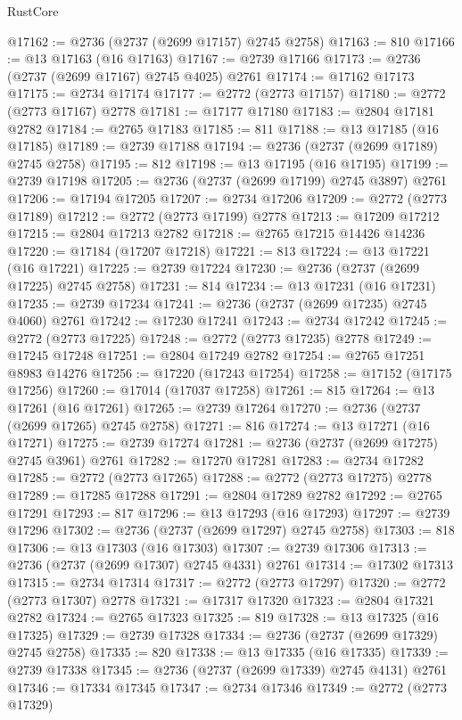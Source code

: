 \begin{lexlean}{RustCore}
\begin{coremodule}
@17162 := @2736 (@2737 (@2699 @17157) @2745 @2758)
@17163 := 810
@17166 := @13 @17163 (@16 @17163)
@17167 := @2739 @17166
@17173 := @2736 (@2737 (@2699 @17167) @2745 @4025) @2761
@17174 := @17162 @17173
@17175 := @2734 @17174
@17177 := @2772 (@2773 @17157)
@17180 := @2772 (@2773 @17167) @2778
@17181 := @17177 @17180
@17183 := @2804 @17181 @2782
@17184 := @2765 @17183
@17185 := 811
@17188 := @13 @17185 (@16 @17185)
@17189 := @2739 @17188
@17194 := @2736 (@2737 (@2699 @17189) @2745 @2758)
@17195 := 812
@17198 := @13 @17195 (@16 @17195)
@17199 := @2739 @17198
@17205 := @2736 (@2737 (@2699 @17199) @2745 @3897) @2761
@17206 := @17194 @17205
@17207 := @2734 @17206
@17209 := @2772 (@2773 @17189)
@17212 := @2772 (@2773 @17199) @2778
@17213 := @17209 @17212
@17215 := @2804 @17213 @2782
@17218 := @2765 @17215 @14426 @14236
@17220 := @17184 (@17207 @17218)
@17221 := 813
@17224 := @13 @17221 (@16 @17221)
@17225 := @2739 @17224
@17230 := @2736 (@2737 (@2699 @17225) @2745 @2758)
@17231 := 814
@17234 := @13 @17231 (@16 @17231)
@17235 := @2739 @17234
@17241 := @2736 (@2737 (@2699 @17235) @2745 @4060) @2761
@17242 := @17230 @17241
@17243 := @2734 @17242
@17245 := @2772 (@2773 @17225)
@17248 := @2772 (@2773 @17235) @2778
@17249 := @17245 @17248
@17251 := @2804 @17249 @2782
@17254 := @2765 @17251 @8983 @14276
@17256 := @17220 (@17243 @17254)
@17258 := @17152 (@17175 @17256)
@17260 := @17014 (@17037 @17258)
@17261 := 815
@17264 := @13 @17261 (@16 @17261)
@17265 := @2739 @17264
@17270 := @2736 (@2737 (@2699 @17265) @2745 @2758)
@17271 := 816
@17274 := @13 @17271 (@16 @17271)
@17275 := @2739 @17274
@17281 := @2736 (@2737 (@2699 @17275) @2745 @3961) @2761
@17282 := @17270 @17281
@17283 := @2734 @17282
@17285 := @2772 (@2773 @17265)
@17288 := @2772 (@2773 @17275) @2778
@17289 := @17285 @17288
@17291 := @2804 @17289 @2782
@17292 := @2765 @17291
@17293 := 817
@17296 := @13 @17293 (@16 @17293)
@17297 := @2739 @17296
@17302 := @2736 (@2737 (@2699 @17297) @2745 @2758)
@17303 := 818
@17306 := @13 @17303 (@16 @17303)
@17307 := @2739 @17306
@17313 := @2736 (@2737 (@2699 @17307) @2745 @4331) @2761
@17314 := @17302 @17313
@17315 := @2734 @17314
@17317 := @2772 (@2773 @17297)
@17320 := @2772 (@2773 @17307) @2778
@17321 := @17317 @17320
@17323 := @2804 @17321 @2782
@17324 := @2765 @17323
@17325 := 819
@17328 := @13 @17325 (@16 @17325)
@17329 := @2739 @17328
@17334 := @2736 (@2737 (@2699 @17329) @2745 @2758)
@17335 := 820
@17338 := @13 @17335 (@16 @17335)
@17339 := @2739 @17338
@17345 := @2736 (@2737 (@2699 @17339) @2745 @4131) @2761
@17346 := @17334 @17345
@17347 := @2734 @17346
@17349 := @2772 (@2773 @17329)

\end{coremodule}
\end{lexlean}
